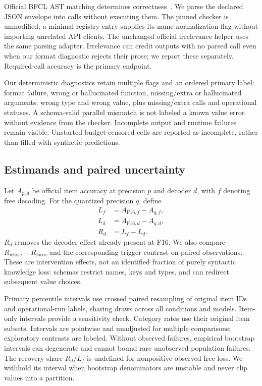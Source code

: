 \documentclass[10pt,twocolumn]{article}
\begin{document}
Official BFCL AST matching determines correctness~\cite{bfcl}. We parse the declared JSON envelope into calls without executing them. The pinned checker is unmodified; a minimal registry entry supplies its name-normalization flag without importing unrelated API clients. The unchanged official irrelevance helper uses the same parsing adapter. Irrelevance can credit outputs with no parsed call even when our format diagnostic rejects their prose; we report these separately. Required-call accuracy is the primary endpoint.

Our deterministic diagnostics retain multiple flags and an ordered primary label: format failure, wrong or hallucinated function, missing/extra or hallucinated arguments, wrong type and wrong value, plus missing/extra calls and operational statuses. A schema-valid parallel mismatch is not labeled a known value error without evidence from the checker. Incomplete output and runtime failures remain visible. Unstarted budget-censored cells are reported as incomplete, rather than filled with synthetic predictions.

\subsection{Estimands and paired uncertainty}
Let $A_{p,d}$ be official item accuracy at precision $p$ and decoder $d$, with $f$ denoting free decoding. For the quantized precision $q$, define
\begin{align}
 L_f &= A_{\mathrm{F16},f}-A_{q,f},\\
 L_d &= A_{\mathrm{F16},d}-A_{q,d},\\
 R_d &= L_f-L_d.
\end{align}
$R_d$ removes the decoder effect already present at F16. We also compare $R_{\mathrm{whole}}-R_{\mathrm{loose}}$ and the corresponding trigger contrast on paired observations. These are intervention effects, not an identified fraction of purely syntactic knowledge loss: schemas restrict names, keys and types, and can redirect subsequent value choices.

Primary percentile intervals use crossed paired resampling of original item IDs and operational-run labels, sharing draws across all conditions and models. Item-only intervals provide a sensitivity check. Category rates use their original item subsets. Intervals are pointwise and unadjusted for multiple comparisons; exploratory contrasts are labeled. Without observed failures, empirical bootstrap intervals can degenerate and cannot bound rare unobserved population failures. The recovery share $R_d/L_f$ is undefined for nonpositive observed free loss. We withhold its interval when bootstrap denominators are unstable and never clip values into a partition.
\end{document}
